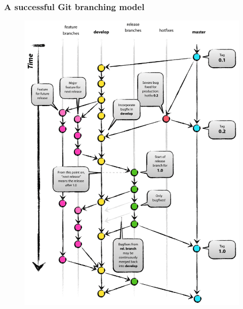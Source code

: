 \documentclass{beamer}
\begin{document}
\begin{frame}
    \frametitle{A successful Git branching model}
    \begin{figure}
        \includegraphics[scale=0.15]{imgs/git-model.png}
    \end{figure}
\end{frame}
\end{document}
